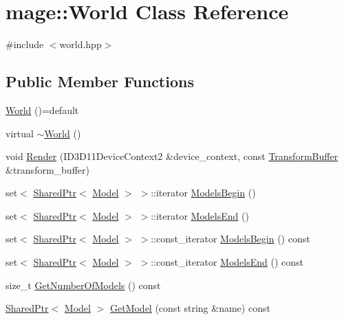 \hypertarget{classmage_1_1_world}{}\section{mage\+:\+:World Class Reference}
\label{classmage_1_1_world}


{\ttfamily \#include $<$world.\+hpp$>$}

\subsection*{Public Member Functions}
\begin{DoxyCompactItemize}
\item 
\hyperlink{classmage_1_1_world_a80582236a880812f9795a28ae5523cf7}{World} ()=default
\item 
virtual \hyperlink{classmage_1_1_world_aa51807f68564554dcc2e5f4527e0a620}{$\sim$\+World} ()
\item 
void \hyperlink{classmage_1_1_world_a622c386b528b34571e3e5e9d207fcada}{Render} (I\+D3\+D11\+Device\+Context2 \&device\+\_\+context, const \hyperlink{structmage_1_1_transform_buffer}{Transform\+Buffer} \&transform\+\_\+buffer)
\item 
set$<$ \hyperlink{namespacemage_a1e01ae66713838a7a67d30e44c67703e}{Shared\+Ptr}$<$ \hyperlink{classmage_1_1_model}{Model} $>$ $>$\+::iterator \hyperlink{classmage_1_1_world_acdbf2922c2b755fb9ff368b3bab3edb1}{Models\+Begin} ()
\item 
set$<$ \hyperlink{namespacemage_a1e01ae66713838a7a67d30e44c67703e}{Shared\+Ptr}$<$ \hyperlink{classmage_1_1_model}{Model} $>$ $>$\+::iterator \hyperlink{classmage_1_1_world_aa52fa727f94a855e55d9fed72be8fd60}{Models\+End} ()
\item 
set$<$ \hyperlink{namespacemage_a1e01ae66713838a7a67d30e44c67703e}{Shared\+Ptr}$<$ \hyperlink{classmage_1_1_model}{Model} $>$ $>$\+::const\+\_\+iterator \hyperlink{classmage_1_1_world_a38b6ada350e36132f94df20fb0365177}{Models\+Begin} () const
\item 
set$<$ \hyperlink{namespacemage_a1e01ae66713838a7a67d30e44c67703e}{Shared\+Ptr}$<$ \hyperlink{classmage_1_1_model}{Model} $>$ $>$\+::const\+\_\+iterator \hyperlink{classmage_1_1_world_ad7e9615a659dad4190b16dc28932c007}{Models\+End} () const
\item 
size\+\_\+t \hyperlink{classmage_1_1_world_a6e04fdde74a2616746cdafd12537c4a7}{Get\+Number\+Of\+Models} () const
\item 
\hyperlink{namespacemage_a1e01ae66713838a7a67d30e44c67703e}{Shared\+Ptr}$<$ \hyperlink{classmage_1_1_model}{Model} $>$ \hyperlink{classmage_1_1_world_ac91abee028df87d8879332e0df3d9e8a}{Get\+Model} (const string \&name) const

\end{DoxyCompactItemize}
